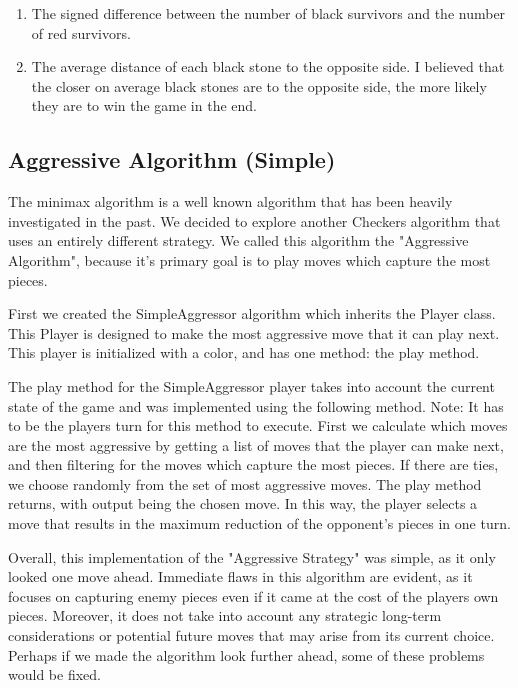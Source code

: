 \documentclass[fontsize=11pt]{article}
\begin{document}
\begin{enumerate}
    \item The signed difference between the number of black survivors and the number of red survivors.

    \item The average distance of each black stone to the opposite side. I believed that the closer on average black stones are to the opposite side, the more likely they are to win the game in the end.
\end{enumerate}






 
\subsection*{Aggressive Algorithm (Simple)}
The minimax algorithm is a well known algorithm that has been heavily investigated in the past. We decided to explore another Checkers algorithm that uses an entirely different strategy. We called this algorithm the "Aggressive Algorithm", because it's primary goal is to play moves which capture the most pieces. \newline

First we created the SimpleAggressor algorithm which inherits the Player class. This Player is designed to make the most aggressive move that it can play next. This player is initialized with a color, and has one method: the play method. \newline

The play method for the SimpleAggressor player takes into account the current state of the game and was implemented using the following method. Note: It has to be the players turn for this method to execute.
First we calculate which moves are the most aggressive by getting a list of moves that the player can make next, and then filtering for the moves which capture the most pieces. If there are ties, we choose randomly from the set of most aggressive moves. The play method returns, with output being the chosen move. In this way, the player selects a move that results in the maximum reduction of the opponent's pieces in one turn. \newline

Overall, this implementation of the "Aggressive Strategy" was simple, as it only looked one move ahead. Immediate flaws in this algorithm are evident, as it focuses on capturing enemy pieces even if it came at the cost of the players own pieces. Moreover, it does not take into account any strategic long-term considerations or potential future moves that may arise from its current choice. Perhaps if we made the algorithm look further ahead, some of these problems would be fixed. 
\end{document}
